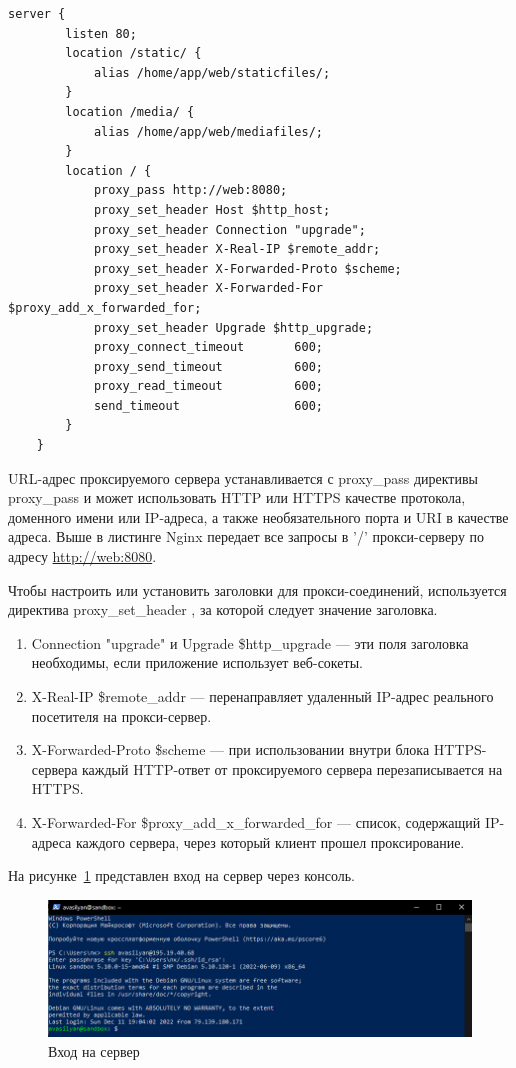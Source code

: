 \begin{lstlisting}[frame=single, label={rndhpcgui.2022.12.07.nginx.conf}, caption={nginx.conf}, language={nginx}] 
	server {
	    listen 80;
	    location /static/ {
	        alias /home/app/web/staticfiles/;
	    }
	    location /media/ {
	        alias /home/app/web/mediafiles/;
	    }
	    location / {
	        proxy_pass http://web:8080;
	        proxy_set_header Host $http_host;
	        proxy_set_header Connection "upgrade";
	        proxy_set_header X-Real-IP $remote_addr;
	        proxy_set_header X-Forwarded-Proto $scheme;
	        proxy_set_header X-Forwarded-For $proxy_add_x_forwarded_for;
	        proxy_set_header Upgrade $http_upgrade;
	        proxy_connect_timeout       600;
	        proxy_send_timeout          600;
	        proxy_read_timeout          600;
	        send_timeout                600;
	    }
	}
\end{lstlisting}

URL-адрес проксируемого сервера устанавливается с proxy_pass директивы proxy_pass и может использовать HTTP или HTTPS качестве протокола, доменного имени или IP-адреса, а также необязательного порта и URI в качестве адреса. Выше в листинге Nginx передает все запросы в '/' прокси-серверу по адресу \url{http://web:8080}.

Чтобы настроить или установить заголовки для прокси-соединений, используется директива proxy_set_header , за которой следует значение заголовка. 
\begin{enumerate}
	\item Connection "upgrade" и Upgrade \$http\_upgrade — эти поля заголовка необходимы, если приложение использует веб-сокеты.
	\item X-Real-IP \$remote_addr — перенаправляет удаленный IP-адрес реального посетителя на прокси-сервер.
	\item X-Forwarded-Proto \$scheme — при использовании внутри блока HTTPS-сервера каждый HTTP-ответ от проксируемого сервера перезаписывается на HTTPS.
	\item X-Forwarded-For \$proxy_add_x_forwarded_for — список, содержащий IP-адреса каждого сервера, через который клиент прошел проксирование.
\end{enumerate}

На рисунке~\ref{rndhpcgui.2022.12.07.picture1} представлен вход на сервер через консоль. 
\begin{figure}[!ht]
  \centering
  \includegraphics[scale=0.8]{ResearchNotes/rndhpc_dev_gui_2022_12_07/rndhpcgui.2022.12.07.picture1.png}
  \caption{Вход на сервер}\label{rndhpcgui.2022.12.07.picture1}
\end{figure}


